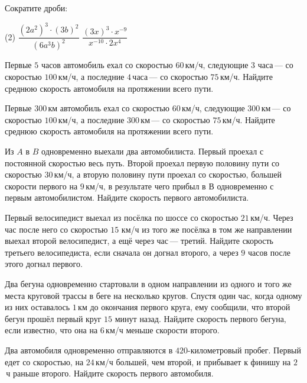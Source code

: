 \begin{class}[number=6]
	\begin{listofex}
		\item Сократите дроби:
		\begin{tasks}(2)
			\task \( \dfrac{(2a^2)^3\cdot(3b)^2}{(6a^3b)^2} \)
			\task \( \dfrac{(3x)^3\cdot x^{-9}}{x^{-10}\cdot2x^4} \)
		\end{tasks}
		\item Первые \( 5 \) часов автомобиль ехал со скоростью \( 60 \) км/ч, следующие \( 3 \) часа --- со скоростью \( 100 \) км/ч, а последние \( 4 \) часа --- со скоростью \( 75 \) км/ч. Найдите среднюю скорость автомобиля на протяжении всего пути.
		\item Первые \( 300 \) км автомобиль ехал со скоростью \( 60 \) км/ч, следующие \( 300 \) км --- со скоростью \( 100 \) км/ч, а последние \( 300 \) км --- со скоростью \( 75 \) км/ч. Найдите среднюю скорость автомобиля на протяжении всего пути.
		\item Из \( A \) в \( B \) одновременно выехали два автомобилиста. Первый проехал с постоянной скоростью весь путь. Второй проехал первую половину пути со скоростью \( 30 \) км/ч, а вторую половину пути проехал со скоростью, большей скорости первого на \( 9 \) км/ч, в результате чего прибыл в \( В \) одновременно с первым автомобилистом. Найдите скорость первого автомобилиста.
		\item Первый велосипедист выехал из посёлка по шоссе со скоростью \( 21 \) км/ч. Через час после него со скоростью \( 15 \) км/ч из того же посёлка в том же направлении выехал второй велосипедист, а ещё через час --- третий. Найдите скорость третьего велосипедиста, если сначала он догнал второго, а через \( 9 \) часов после этого догнал первого.
		\item Два бегуна одновременно стартовали в одном направлении из одного и того же места круговой трассы в беге на несколько кругов. Спустя один час, когда одному из них оставалось \( 1 \) км до окончания первого круга, ему сообщили, что второй бегун прошёл первый круг \( 15 \) минут назад. Найдите скорость первого бегуна, если известно, что она на \( 6 \) км/ч меньше скорости второго.
		\item Два автомобиля одновременно отправляются в \( 420 \)-километровый пробег. Первый едет со скоростью, на \( 24 \) км/ч большей, чем второй, и прибывает к финишу на \( 2 \) ч раньше второго. Найдите скорость первого автомобиля.
	\end{listofex}
\end{class}

